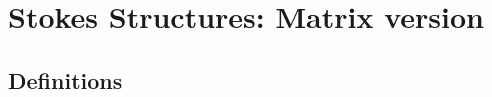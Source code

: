 \section{Stokes Structures: Matrix version}
\begin{comment}
  See
  \begin{itemize}
    \item \cite{Loday1994}
    \item \cite{boalch} and \cite{thboalch}
    \item \cite{babbitt1989local}
  \end{itemize}
\end{comment}

\subsection{Definitions}

